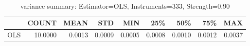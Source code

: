 \begin{table}[ht]
\centering
\caption{variance summary: Estimator=OLS, Instruments=333, Strength=0.90}
\begin{tabular}{lrrrrrrrr}
\toprule
 & COUNT & MEAN & STD & MIN & 25\% & 50\% & 75\% & MAX \\
\midrule
OLS & 10.0000 & 0.0013 & 0.0009 & 0.0005 & 0.0008 & 0.0010 & 0.0012 & 0.0037 \\
\bottomrule
\end{tabular}
\end{table}
